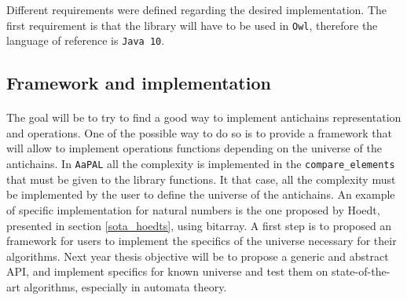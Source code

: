 \documentclass[letterpaper]{article}
\theoremstyle{definition}
\begin{document}
Different requirements were defined regarding the desired implementation.
The first requirement is that the library will have to be used in
\texttt{Owl}, therefore the language of reference is \texttt{Java 10}.


%
%
%

\subsection{Framework and implementation}

\paragraph{}


The goal will be to try to find a good
way to implement antichains representation
and operations. One of the possible way to do so is to provide
a framework that will allow to implement
operations functions
depending on the universe of the antichains.
In \texttt{AaPAL} all the complexity
is implemented in the \texttt{compare\_elements} that must be given
to the library functions. It that case, all the complexity
must be implemented by the user to define the universe of the antichains.
An example of specific implementation for natural numbers is the one
proposed by Hoedt, presented in section \ref{sota_hoedts},
using bitarray. A first step
is to proposed an framework for users to implement the specifics of the
universe necessary for their algorithms. Next year thesis objective will
be to propose a generic and abstract API, and implement specifics
for known universe and test them on state-of-the-art algorithms,
especially in automata theory.






\end{document}
